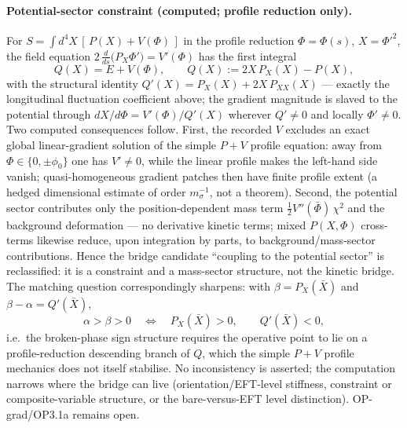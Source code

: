 \paragraph{Potential-sector constraint (computed; profile
reduction only).}
For $S=\int d^4X\,[\,P(X)+V(\Phi)\,]$ in the profile reduction
$\Phi=\Phi(s)$, $X=\Phi'^2$, the field equation
$2\,\tfrac{d}{ds}\bigl(P_X\Phi'\bigr)=V'(\Phi)$ has the first
integral
\[
Q(X)=E+V(\Phi),\qquad Q(X):=2X\,P_X(X)-P(X),
\]
with the structural identity
$Q'(X)=P_X(X)+2X\,P_{XX}(X)$ --- exactly the longitudinal
fluctuation coefficient above; the gradient magnitude is slaved
to the potential through $dX/d\Phi=V'(\Phi)/Q'(X)$ wherever
$Q'\neq0$ and locally $\Phi'\neq0$.
Two computed consequences follow.
First, the recorded $V$ excludes an exact global linear-gradient
solution of the simple $P{+}V$ profile equation: away from
$\Phi\in\{0,\pm\phi_0\}$ one has $V'\neq0$, while the linear
profile makes the left-hand side vanish; quasi-homogeneous
gradient patches then have finite profile extent (a hedged
dimensional estimate of order $m_\sigma^{-1}$, not a theorem).
Second, the potential sector contributes only the
position-dependent mass term $\tfrac12V''(\bar\Phi)\,\chi^2$ and
the background deformation --- no derivative kinetic terms; mixed
$P(X,\Phi)$ cross-terms likewise reduce, upon integration by
parts, to background/mass-sector contributions.
Hence the bridge candidate ``coupling to the potential sector''
is reclassified: it is a constraint and a mass-sector structure,
not the kinetic bridge.
The matching question correspondingly sharpens: with
$\beta=P_X(\bar X)$ and $\beta-\alpha=Q'(\bar X)$,
\[
\alpha>\beta>0
\quad\Longleftrightarrow\quad
P_X(\bar X)>0,\qquad Q'(\bar X)<0 ,
\]
i.e.\ the broken-phase sign structure requires the operative
point to lie on a profile-reduction descending branch of $Q$,
which the simple $P{+}V$ profile mechanics does not itself
stabilise.
No inconsistency is asserted; the computation narrows where the
bridge can live (orientation/EFT-level stiffness, constraint or
composite-variable structure, or the bare-versus-EFT level
distinction).
OP-grad/OP3.1a remains open.
